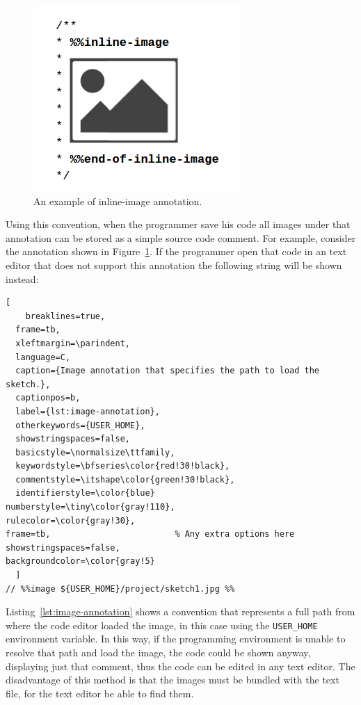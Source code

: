 \begin{figure}[h]
  \centering
  \includegraphics[width=.3\textwidth]{images/inline-image-example}
    \caption{An example of inline-image annotation.}
  \label{fig:inline-image}
\end{figure}

Using this convention, when the programmer save his code all images under that annotation can be stored as a simple source code comment. For example, consider the annotation shown in Figure~\ref{fig:inline-image}. If the programmer open that code in an text editor that does not support this annotation the following string will be shown instead:

\begin{center}
\begin{lstlisting}[
    breaklines=true,
  frame=tb,
  xleftmargin=\parindent,
  language=C,
  caption={Image annotation that specifies the path to load the sketch.},
  captionpos=b, 
  label={lst:image-annotation},
  otherkeywords={USER_HOME},
  showstringspaces=false,
  basicstyle=\normalsize\ttfamily,
  keywordstyle=\bfseries\color{red!30!black},
  commentstyle=\itshape\color{green!30!black},
  identifierstyle=\color{blue}
numberstyle=\tiny\color{gray!110},
rulecolor=\color{gray!30},
frame=tb,                         % Any extra options here
showstringspaces=false,
backgroundcolor=\color{gray!5} 
  ]
// %%image ${USER_HOME}/project/sketch1.jpg %%
\end{lstlisting}
\end{center}

\vspace{-2em}

Listing~\ref{lst:image-annotation} shows a convention that represents a full path from where the code editor loaded the image, in this case using the \texttt{USER\_HOME} environment variable. In this way, if the programming environment is unable to resolve that path and load the image, the code could be shown anyway, displaying just that comment, thus the code can be edited in any text editor. The disadvantage of this method is that the images must be bundled with the text file, for the text editor be able to find them.

